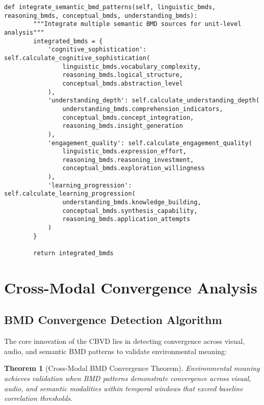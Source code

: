 \documentclass[12pt,a4paper]{article}
\newtheorem{theorem}{Theorem}[section]
\begin{document}
\begin{lstlisting}[style=pythonstyle, caption=Semantic BMD Pattern Recognition]
    def integrate_semantic_bmd_patterns(self, linguistic_bmds, reasoning_bmds, conceptual_bmds, understanding_bmds):
        """Integrate multiple semantic BMD sources for unit-level analysis"""
        integrated_bmds = {
            'cognitive_sophistication': self.calculate_cognitive_sophistication(
                linguistic_bmds.vocabulary_complexity,
                reasoning_bmds.logical_structure,
                conceptual_bmds.abstraction_level
            ),
            'understanding_depth': self.calculate_understanding_depth(
                understanding_bmds.comprehension_indicators,
                conceptual_bmds.concept_integration,
                reasoning_bmds.insight_generation
            ),
            'engagement_quality': self.calculate_engagement_quality(
                linguistic_bmds.expression_effort,
                reasoning_bmds.reasoning_investment,
                conceptual_bmds.exploration_willingness
            ),
            'learning_progression': self.calculate_learning_progression(
                understanding_bmds.knowledge_building,
                conceptual_bmds.synthesis_capability,
                reasoning_bmds.application_attempts
            )
        }
        
        return integrated_bmds
\end{lstlisting}

\section{Cross-Modal Convergence Analysis}

\subsection{BMD Convergence Detection Algorithm}

The core innovation of the CBVD lies in detecting convergence across visual, audio, and semantic BMD patterns to validate environmental meaning:

\begin{theorem}[Cross-Modal BMD Convergence Theorem]
Environmental meaning achieves validation when BMD patterns demonstrate convergence across visual, audio, and semantic modalities within temporal windows that exceed baseline correlation thresholds.
\end{theorem}
\end{document}
